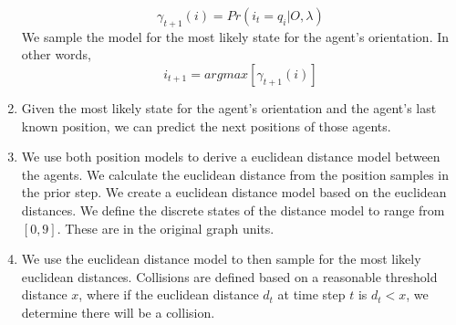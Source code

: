 \begin{enumerate}
    $$\gamma_{t+1}(i) = Pr(i_t=q_i|O, \lambda)$$
    We sample the model for the most likely state for the agent's orientation. In other words, 
    $$i_{t+1} = argmax[ \gamma_{t+1}(i)]$$
    \item Given the most likely state for the agent's orientation and the agent's last known position, we can predict the next positions of those agents. 
    \item We use both position models to derive a euclidean distance model between the agents. We calculate the euclidean distance from the position samples in the prior step. We create a euclidean distance model based on the euclidean distances. We define the discrete states of the distance model to range from $[0, 9]$. These are in the original graph units. 
    \item We use the euclidean distance model to then sample for the most likely euclidean distances. Collisions are defined based on a reasonable threshold distance $x$, where if the euclidean distance $d_t$ at time step $t$ is $d_t < x$, we determine there will be a collision. 
\end{enumerate}
